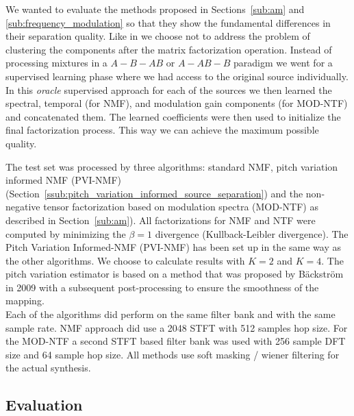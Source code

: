 We wanted to evaluate the methods proposed in Sections~\ref{sub:am} and \ref{sub:frequency_modulation} so that they show the fundamental differences in their separation quality. Like in \cite{barker13} we choose not to address the problem of clustering the components after the matrix factorization operation. Instead of processing mixtures in a $A-B-AB$ or $A-AB-B$ paradigm we went for a supervised learning phase where we had access to the original source individually. In this \emph{oracle} supervised approach for each of the sources we then learned the spectral, temporal (for NMF), and modulation gain components (for MOD-NTF) and concatenated them. The learned coefficients were then used to initialize the final factorization process. This way we can achieve the maximum possible quality.


The test set was processed by three algorithms: standard NMF, pitch variation informed NMF (PVI-NMF) (Section~\ref{ssub:pitch_variation_informed_source_separation}) and the non-negative tensor factorization based on modulation spectra (MOD-NTF) as described in Section~\ref{sub:am}). All factorizations for NMF and NTF were computed by minimizing the $\beta = 1$ divergence (Kullback-Leibler divergence). The Pitch Variation Informed-NMF (PVI-NMF) has been set up in the same way as the other algorithms. We choose to calculate results with $K=2$ and $K=4$. The pitch variation estimator is based on a method that was proposed by B\"ackstr\"om in 2009 \cite{backstrom09} with a subsequent post-processing to ensure the smoothness of the mapping. \\

Each of the algorithms did perform on the same filter bank and with the same sample rate. NMF approach did use a 2048 STFT with 512 samples hop size. For the MOD-NTF a second STFT based filter bank was used with 256 sample DFT size and 64 sample hop size. All methods use soft masking / wiener filtering for the actual synthesis.

\subsection{Evaluation}

